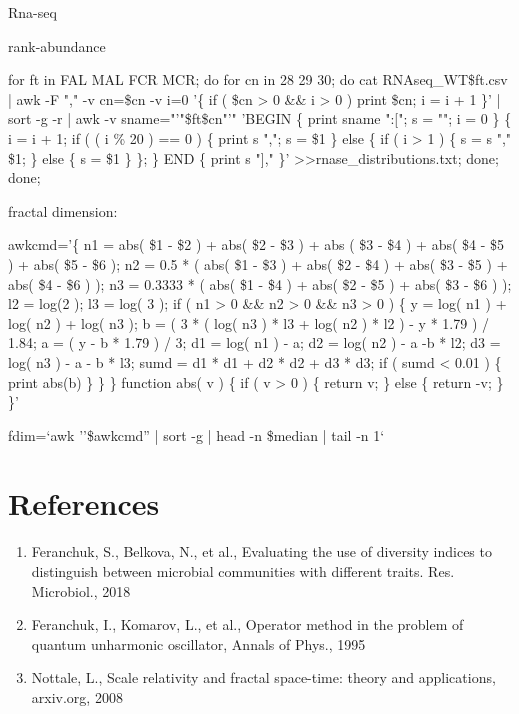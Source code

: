 \documentclass[a4paper]{article}
\begin{document}
Rna-seq

rank-abundance

for ft in FAL MAL FCR MCR; do for cn in 28 29 30; do cat RNAseq\_WT\$ft.csv | awk -F "," -v cn=\$cn -v i=0 '\{ if ( \$cn > 0 \&\& i > 0 ) print \$cn; i = i + 1 \}' | sort -g -r | awk -v sname="'"\$ft\$cn"'" 'BEGIN \{ print sname ":["; s = ""; i = 0 \} \{ i = i + 1; if ( ( i \% 20 ) == 0 ) \{ print s ","; s = \$1 \} else \{ if ( i > 1 ) \{ s = s "," \$1; \} else \{ s = \$1 \} \}; \} END \{ print s "]," \}' >>rnase\_distributions.txt; done; done;

fractal dimension:

{\texttt \small
awkcmd='\{ n1 = abs( \$1 - \$2 ) + abs( \$2 - \$3 ) + abs ( \$3 - \$4 ) + abs(  \$4 - \$5 ) + abs( \$5 - \$6 ); n2 = 0.5 * ( abs(  \$1 - \$3 ) + abs( \$2 - \$4 ) +  abs(  \$3 - \$5 ) + abs( \$4 - \$6 ) ); n3 = 0.3333 * ( abs(  \$1 - \$4 ) + abs( \$2 - \$5 ) + abs( \$3 - \$6 ) ); l2 = log(2 ); l3 = log( 3 );  if ( n1 > 0 \&\& n2 > 0 \&\& n3 > 0 ) \{ y = log( n1 ) + log( n2 ) + log( n3 ); b = ( 3 * ( log( n3 ) * l3 + log( n2 ) * l2 ) - y * 1.79 ) / 1.84; a = ( y - b * 1.79 ) / 3; d1 = log( n1 ) - a; d2 = log( n2 ) - a -b * l2; d3 = log( n3 ) - a - b * l3; sumd = d1 * d1 + d2 * d2 + d3 * d3; if ( sumd < 0.01 ) \{ print abs(b) \} \}  \} function abs( v ) \{ if ( v > 0 ) \{ return v; \} else \{ return -v; \} \}'

fdim=`awk ''\$awkcmd'' | sort -g | head -n \$median | tail -n 1`
}

\section{References}

\begin{enumerate}

\item Feranchuk, S., Belkova, N., et al., Evaluating the use of diversity indices to distinguish between microbial communities with different traits. Res. Microbiol., 2018

\item Feranchuk, I., Komarov, L., et al., Operator method in the problem of quantum unharmonic oscillator, Annals of Phys., 1995 

\item Nottale, L., Scale relativity and fractal space-time: theory and applications, arxiv.org, 2008

\end{enumerate}
\end{document}
